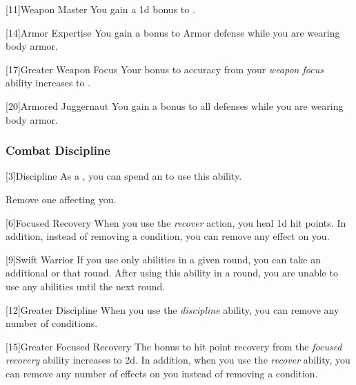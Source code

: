             [11]{Weapon Master} 
            You gain a \plus1d bonus to .

            [14]{Armor Expertise}
            You gain a  bonus to Armor defense while you are wearing body armor.

            [17]{Greater Weapon Focus} 
            Your bonus to accuracy from your \textit{weapon focus} ability increases to .

            [20]{Armored Juggernaut}
            You gain a  bonus to all defenses while you are wearing body armor.

        \subsubsection{Combat Discipline}

            [3]{Discipline} As a , you can spend an  to use this ability.
            \begin{ability}
                \begin{spelleffects}
                    \spelleffect Remove one  affecting you.
                \end{spelleffects}
            \end{ability}

            [6]{Focused Recovery}
            When you use the \textit{recover} action, you heal \plus1d hit points.
            In addition, instead of removing a condition, you can remove any  effect on you.

            [9]{Swift Warrior}
            If you use only  abilities in a given round, you can take an additional  or  that round.
            After using this ability in a round, you are unable to use any  abilities until the next round.

            [12]{Greater Discipline}
            When you use the \textit{discipline} ability, you can remove any number of conditions.

            [15]{Greater Focused Recovery}
            The bonus to hit point recovery from the \textit{focused recovery} ability increases to \plus2d.
            In addition, when you use the \textit{recover} ability, you can remove any number of  effects on you instead of removing a condition.

